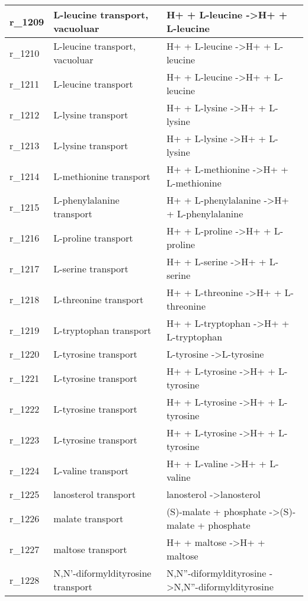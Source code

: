 \begin{landscape}
{\begin{longtable}{|l|p{7cm}|p{15cm}|}
r\_1209 & L-leucine transport, vacuoluar & H+ + L-leucine  -\textgreater H+ + L-leucine \\ \hline
r\_1210 & L-leucine transport, vacuoluar & H+ + L-leucine  -\textgreater H+ + L-leucine \\ \hline
r\_1211 & L-leucine transport & H+ + L-leucine  -\textgreater H+ + L-leucine \\ \hline
r\_1212 & L-lysine transport & H+ + L-lysine  -\textgreater H+ + L-lysine \\ \hline
r\_1213 & L-lysine transport & H+ + L-lysine  -\textgreater H+ + L-lysine \\ \hline
r\_1214 & L-methionine transport & H+ + L-methionine  -\textgreater H+ + L-methionine \\ \hline
r\_1215 & L-phenylalanine transport & H+ + L-phenylalanine  -\textgreater H+ + L-phenylalanine \\ \hline
r\_1216 & L-proline transport & H+ + L-proline  -\textgreater H+ + L-proline \\ \hline
r\_1217 & L-serine transport & H+ + L-serine  -\textgreater H+ + L-serine \\ \hline
r\_1218 & L-threonine transport & H+ + L-threonine  -\textgreater H+ + L-threonine \\ \hline
r\_1219 & L-tryptophan transport & H+ + L-tryptophan  -\textgreater H+ + L-tryptophan \\ \hline
r\_1220 & L-tyrosine transport & L-tyrosine  -\textgreater L-tyrosine \\ \hline
r\_1221 & L-tyrosine transport & H+ + L-tyrosine  -\textgreater H+ + L-tyrosine \\ \hline
r\_1222 & L-tyrosine transport & H+ + L-tyrosine  -\textgreater H+ + L-tyrosine \\ \hline
r\_1223 & L-tyrosine transport & H+ + L-tyrosine  -\textgreater H+ + L-tyrosine \\ \hline
r\_1224 & L-valine transport & H+ + L-valine  -\textgreater H+ + L-valine \\ \hline
r\_1225 & lanosterol transport & lanosterol  -\textgreater lanosterol \\ \hline
r\_1226 & malate transport & (S)-malate + phosphate  -\textgreater (S)-malate + phosphate \\ \hline
r\_1227 & maltose transport & H+ + maltose  -\textgreater H+ + maltose \\ \hline
r\_1228 & N,N'-diformyldityrosine transport & N,N''-diformyldityrosine  -\textgreater N,N''-diformyldityrosine \\ \hline

\end{longtable}}
\end{landscape}
